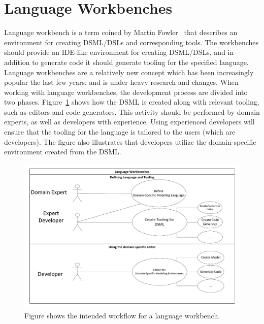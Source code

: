 \section{Language Workbenches}\label{sec:language_workbenches}
Language workbench is a term coined by Martin Fowler~\cite{fowler2010domain} that describes an environment for creating DSML/DSLs and corresponding tools. The workbenches should provide an IDE-like environment for creating DSML/DSLs, and in addition to generate code it should generate tooling for the specified language. Language workbenches are a relatively new concept which has been increasingly popular the last few years, and is under heavy research and changes. 
When working with language workbenches, the development process are divided into two phases. Figure~\ref{fig:lwusecase} shows how the DSML is created along with relevant tooling, such as editors and code generators. This activity should be performed by domain experts, as well as developers with experience. Using experienced developers will ensure that the tooling for the language is tailored to the users (which are developers). The figure also illustrates that developers utilize the domain-specific environment created from the DSML. \newline
\begin{figure}[hp]
    \centering
    \centerline{\includegraphics[scale=0.5]{images/LanguageWorkbenchUseCase.pdf}}
    \caption[Language workbench workflow]{Figure shows the intended workflow for a language workbench.}
    \label{fig:lwusecase}
\end{figure}

